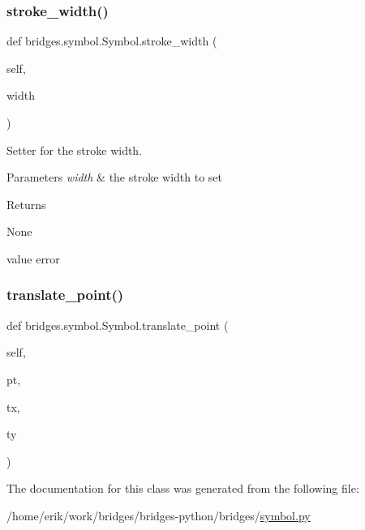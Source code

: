 \subsubsection{\texorpdfstring{stroke\+\_\+width()}{stroke\_width()}\hspace{0.1cm}{\footnotesize\ttfamily [2/2]}}
{\footnotesize\ttfamily def bridges.\+symbol.\+Symbol.\+stroke\+\_\+width (\begin{DoxyParamCaption}\item[{}]{self,  }\item[{}]{width }\end{DoxyParamCaption})}



Setter for the stroke width. 


\begin{DoxyParams}{Parameters}
{\em width} & the stroke width to set \\
\hline
\end{DoxyParams}
\begin{DoxyReturn}{Returns}


None \begin{DoxyVerb}       value error\end{DoxyVerb}
 
\end{DoxyReturn}
\mbox{\label{classbridges_1_1symbol_1_1_symbol_a9600a66f48ad38baf42a2043db13334b}} 
\subsubsection{\texorpdfstring{translate\+\_\+point()}{translate\_point()}}
{\footnotesize\ttfamily def bridges.\+symbol.\+Symbol.\+translate\+\_\+point (\begin{DoxyParamCaption}\item[{}]{self,  }\item[{}]{pt,  }\item[{}]{tx,  }\item[{}]{ty }\end{DoxyParamCaption})}



The documentation for this class was generated from the following file\+:\begin{DoxyCompactItemize}
\item 
/home/erik/work/bridges/bridges-\/python/bridges/\hyperlink{symbol_8py}{symbol.\+py}\end{DoxyCompactItemize}
